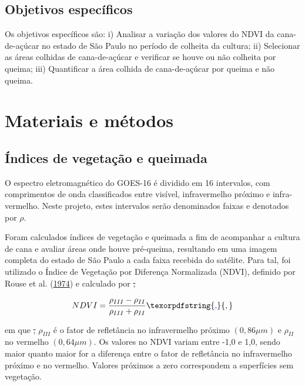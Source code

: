 \documentclass[11pt,brazil,]{article}
\providecommand{\DIFaddtex}[1]{{\protect\color{blue}\uwave{#1}}} %
\providecommand{\DIFdeltex}[1]{{\protect\color{red}\sout{#1}}}                      %
\providecommand{\DIFaddbegin}{} %
\providecommand{\DIFaddend}{} %
\providecommand{\DIFdelbegin}{} %
\providecommand{\DIFdelend}{} %
\providecommand{\DIFadd}[1]{\texorpdfstring{\DIFaddtex{#1}}{#1}} %
\providecommand{\DIFdel}[1]{\texorpdfstring{\DIFdeltex{#1}}{}} %
\newcommand{\DIFscaledelfig}{0.5}
\newlength{\DIFdelgraphicswidth} %
\newlength{\DIFdelgraphicsheight} %
\newcommand{\DIFaddincludegraphics}[2][]{{\color{blue}\fbox{\DIFOincludegraphics[#1]{#2}}}} %
\newcommand{\DIFdelincludegraphics}[2][]{%
\sbox{\DIFdelgraphicsbox}{\DIFOincludegraphics[#1]{#2}}%
\settoboxwidth{\DIFdelgraphicswidth}{\DIFdelgraphicsbox} %
\settoboxtotalheight{\DIFdelgraphicsheight}{\DIFdelgraphicsbox} %
\scalebox{\DIFscaledelfig}{%
\parbox[b]{\DIFdelgraphicswidth}{\usebox{\DIFdelgraphicsbox}\\[-\baselineskip] \rule{\DIFdelgraphicswidth}{0em}}\llap{\resizebox{\DIFdelgraphicswidth}{\DIFdelgraphicsheight}{%
\setlength{\unitlength}{\DIFdelgraphicswidth}%
\begin{picture}(1,1)%
\thicklines\linethickness{2pt} %
{\color[rgb]{1,0,0}\put(0,0){\framebox(1,1){}}}%
{\color[rgb]{1,0,0}\put(0,0){\line( 1,1){1}}}%
{\color[rgb]{1,0,0}\put(0,1){\line(1,-1){1}}}%
\end{picture}%
}\hspace*{3pt}}} %
} %
\DeclareRobustCommand{\DIFaddbegin}{\DIFOaddbegin \let\includegraphics\DIFaddincludegraphics} %
\DeclareRobustCommand{\DIFaddend}{\DIFOaddend \let\includegraphics\DIFOincludegraphics} %
\DeclareRobustCommand{\DIFdelbegin}{\DIFOdelbegin \let\includegraphics\DIFdelincludegraphics} %
\DeclareRobustCommand{\DIFdelend}{\DIFOaddend \let\includegraphics\DIFOincludegraphics} %
\begin{document}
\hypertarget{objetivos-especificos}{%
\subsection{Objetivos específicos}\label{objetivos-especificos}}

Os objetivos específicos são: i) Analisar a variação dos valores do NDVI
da cana-de-açúcar no estado de São Paulo no período de colheita da
cultura; ii) Selecionar as áreas colhidas de cana-de-açúcar e verificar
se houve ou não colheita por queima; iii) Quantificar a área colhida de
cana-de-açúcar por queima e não queima.

\hypertarget{materiais-e-metodos}{%
\section{Materiais e métodos}\label{materiais-e-metodos}}

\hypertarget{indices-de-vegetacao-e-queimada}{%
\subsection{Índices de vegetação e
queimada}\label{indices-de-vegetacao-e-queimada}}

O espectro eletromagnético do GOES-16 é dividido em 16 intervalos, com
comprimentos de onda classificados entre visível, infravermelho próximo
e infra-vermelho. Neste projeto, estes intervalos serão denominados
faixas e denotados por \(\rho\).

Foram calculados índices de vegetação e queimada a fim de acompanhar a
cultura de cana e avaliar áreas onde houve pré-queima, resultando em uma
imagem completa do estado de São Paulo a cada faixa recebida do
satélite. Para tal, foi utilizado o Índice de Vegetação por Diferença
Normalizada (NDVI), definido por Rouse et al.
(\protect\hyperlink{ref-rouse1974monitoring}{1974}) e calculado por
\DIFdelbegin \DIFdel{,
}\DIFdelend 

\[ NDVI=\frac{\rho_{III} - \rho_{II}}{\rho_{III} + \rho_{II}}\DIFaddbegin \DIFadd{, }\DIFaddend \]

em que \DIFdelbegin \DIFdel{, }\DIFdelend \(\rho_{III}\) é o fator de refletância no infravermelho próximo
\((0,86 \mu m)\) e \(\rho_{II}\) no vermelho \((0,64 \mu m)\). Os
valores no NDVI variam entre -1,0 e 1,0, sendo maior quanto maior for a
diferença entre o fator de refletância no infravermelho próximo e no
vermelho. Valores próximos a zero correspondem a superfícies sem
vegetação.
\end{document}
